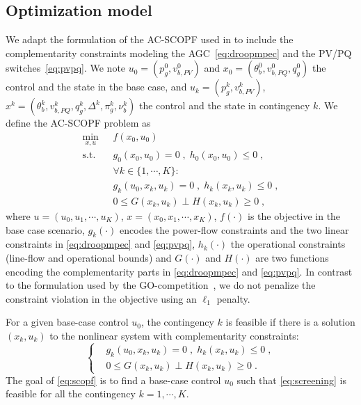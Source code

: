 \documentclass{IEEEtran4PSCC}
\newcommand{\add}[1]{#1}
\begin{document}
\subsection{Optimization model}
We adapt the formulation of the AC-SCOPF used in \cite{frank2016introduction} to include the complementarity
constraints modeling the AGC~\eqref{eq:droopmpec} and the PV/PQ switches~\eqref{eq:pvpq}.
We note $u_0 = (p_g^0, v_{b,PV}^0)$ and $x_0 = (\theta_b^0, v_{b,PQ}^0, q_g^0)$ the control and the state in the base case,
and $u_k = (p_g^k, v_{b,PV}^k)$, $x^k = (\theta_b^k, v_{b,PQ}^k, q_g^k, \Delta^k, \pi_g^k, \nu^k_b)$
the control and the state in contingency $k$. We define the AC-SCOPF problem as
\begin{equation}
  \label{eq:scopf}
  \begin{aligned}
    \min_{x, u} \; & f(x_0, u_0) \\
    \text{s.t.} \quad & g_0(x_0, u_0) = 0 \; , \;  h_0(x_0, u_0) \leq 0 \; , \\
                      & \forall k \in \{1,\cdots,K\} :\\
                            & g_k(u_0, x_k, u_k) = 0 \;, \;  h_k(x_k, u_k) \leq 0 \; , \\
                            & 0 \leq G(x_k, u_k) \perp H(x_k, u_k) \geq 0 \; ,
  \end{aligned}
\end{equation}
where $u = (u_0, u_1, \cdots, u_K)$, $x = (x_0, x_1, \cdots, x_K)$,
$f(\cdot)$ is the objective in the base case scenario,
$g_k(\cdot)$ encodes the power-flow constraints and the two linear constraints
in \eqref{eq:droopmpec} and \eqref{eq:pvpq}, $h_k(\cdot)$ the operational
constraints (line-flow and operational bounds) and $G(\cdot)$ and
$H(\cdot)$ are two functions encoding the
complementarity parts in \eqref{eq:droopmpec} and \eqref{eq:pvpq}.
\add{In contrast to the formulation used by the GO-competition~\cite{aravena2023recent}, we do not
penalize the constraint violation in the objective using an $\ell_1$ penalty.}

For a given base-case control $u_0$, the contingency $k$ is feasible if there is a solution
$(x_k, u_k)$ to the nonlinear system with complementarity constraints:
\begin{equation}
  \label{eq:screening}
  \left\{
  \begin{aligned}
    &  g_k(u_0, x_k, u_k) = 0 \; ,\;  h_k(x_k, u_k) \leq 0 \; , \\
    & 0 \leq G(x_k, u_k) \perp H(x_k, u_k) \geq 0 \; .
  \end{aligned}
  \right.
\end{equation}
The goal of \eqref{eq:scopf} is to find a base-case control $u_0$ such
that \eqref{eq:screening} is feasible for all the contingency $k=1,\cdots,K$.
\end{document}
